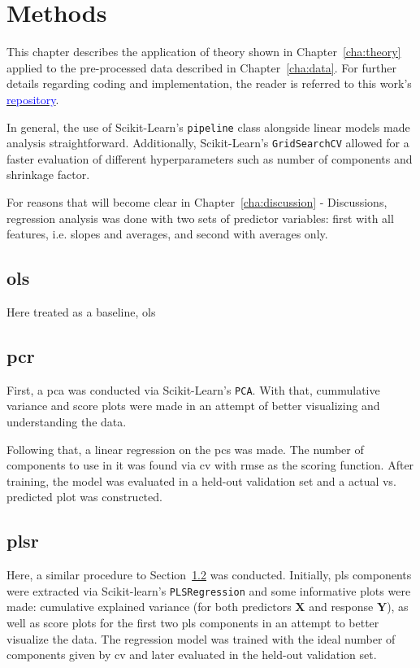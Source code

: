 \chapter{Methods}
\label{cha:methods}

This chapter describes the application of theory shown in Chapter~\ref{cha:theory} applied to the pre-processed data described in Chapter~\ref{cha:data}. For further details regarding coding and implementation, the reader is referred to this work's \href{https://github.com/cosmourao/thesis}{\textcolor{blue}{repository}}.

In general, the use of Scikit-Learn's \texttt{pipeline} class alongside linear models made analysis straightforward. Additionally, Scikit-Learn's \texttt{GridSearchCV} allowed for a faster evaluation of different hyperparameters such as number of components and shrinkage factor.

For reasons that will become clear in Chapter~\ref{cha:discussion} - Discussions, regression analysis was done with two sets of predictor variables: first with all features, i.e. slopes and averages, and second with averages only.

\section{\acrlong{ols}}
\label{sec:met-ols}

Here treated as a baseline, \acrshort{ols}

\section{\acrlong{pcr}}
\label{sec:met-pcr}

First, a \acrshort{pca} was conducted via Scikit-Learn's \texttt{PCA}. With that, cummulative variance and score plots were made in an attempt of better visualizing and understanding the data.

Following that, a linear regression on the \acrshort{pc}s was made. The number of components to use in it was found via \acrshort{cv} with \acrshort{rmse} as the scoring function. After training, the model was evaluated in a held-out validation set and a actual vs. predicted plot was constructed.

\section{\acrlong{plsr}}
\label{sec:met-plsr}

Here, a similar procedure to Section~\ref{sec:met-pcr} was conducted. Initially, \acrshort{pls} components were extracted via Scikit-learn's \texttt{PLSRegression} and some informative plots were made: cumulative explained variance (for both predictors $\mathbf{X}$ and response $\mathbf{Y}$), as well as score plots for the first two \acrshort{pls} components in an attempt to better visualize the data. The regression model was trained with the ideal number of components given by \acrshort{cv} and later evaluated in the held-out validation set.

